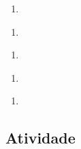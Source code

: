 \documentclass[a4,12pt]{book}
\begin{document}
\begin{enumerate} [\quad a)] %
  \item     
\end{enumerate} %
\begin{enumerate} [\quad a)] %
  \item     
\end{enumerate} %
\begin{enumerate} [\quad a)] %
  \item     
\end{enumerate} %
\begin{enumerate} [\quad a)] %
  \item     
\end{enumerate} %
\begin{enumerate} [\quad a)] %
  \item     
\end{enumerate} %





\subsection{Atividade}
\end{document}
